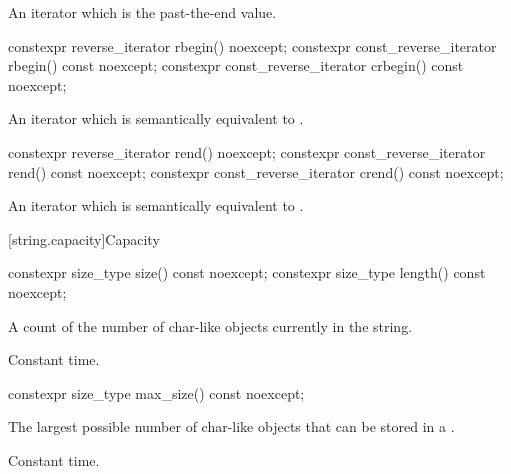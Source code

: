 \begin{itemdescr}
\pnum
\returns
An iterator which is the past-the-end value.
\end{itemdescr}

%
%
\begin{itemdecl}
constexpr reverse_iterator       rbegin() noexcept;
constexpr const_reverse_iterator rbegin() const noexcept;
constexpr const_reverse_iterator crbegin() const noexcept;
\end{itemdecl}

\begin{itemdescr}
\pnum
\returns
An iterator which is semantically equivalent to
.
\end{itemdescr}

%
%
\begin{itemdecl}
constexpr reverse_iterator       rend() noexcept;
constexpr const_reverse_iterator rend() const noexcept;
constexpr const_reverse_iterator crend() const noexcept;
\end{itemdecl}

\begin{itemdescr}
\pnum
\returns
An iterator which is semantically equivalent to
.
\end{itemdescr}

[string.capacity]{Capacity}

%
%
\begin{itemdecl}
constexpr size_type size() const noexcept;
constexpr size_type length() const noexcept;
\end{itemdecl}

\begin{itemdescr}
\pnum
\returns
A count of the number of char-like objects currently in the string.

\pnum
\complexity
Constant time.
\end{itemdescr}

%
\begin{itemdecl}
constexpr size_type max_size() const noexcept;
\end{itemdecl}

\begin{itemdescr}
\pnum
\returns
The largest possible number of char-like objects that can be stored in a
.

\pnum
\complexity
Constant time.
\end{itemdescr}

